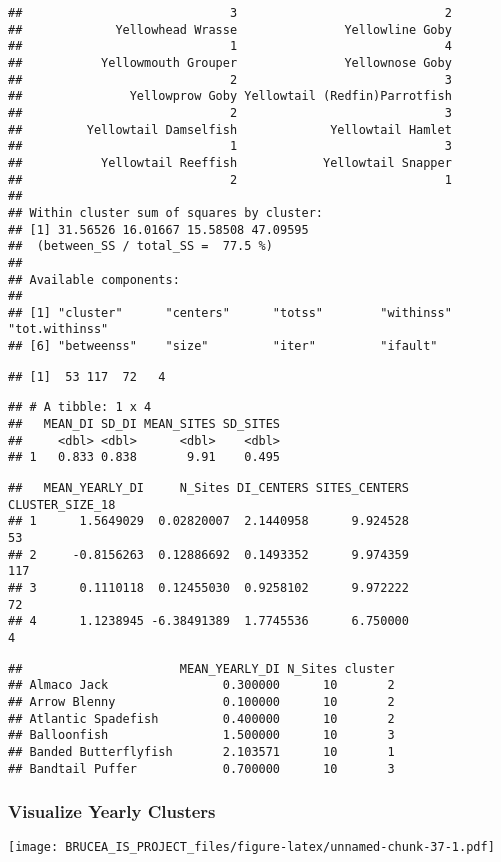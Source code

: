 \documentclass[
]{article}
\begin{document}
\begin{verbatim}
##                             3                             2 
##             Yellowhead Wrasse               Yellowline Goby 
##                             1                             4 
##           Yellowmouth Grouper               Yellownose Goby 
##                             2                             3 
##               Yellowprow Goby Yellowtail (Redfin)Parrotfish 
##                             2                             3 
##         Yellowtail Damselfish             Yellowtail Hamlet 
##                             1                             3 
##           Yellowtail Reeffish            Yellowtail Snapper 
##                             2                             1 
## 
## Within cluster sum of squares by cluster:
## [1] 31.56526 16.01667 15.58508 47.09595
##  (between_SS / total_SS =  77.5 %)
## 
## Available components:
## 
## [1] "cluster"      "centers"      "totss"        "withinss"     "tot.withinss"
## [6] "betweenss"    "size"         "iter"         "ifault"
\end{verbatim}

\begin{verbatim}
## [1]  53 117  72   4
\end{verbatim}

\begin{verbatim}
## # A tibble: 1 x 4
##   MEAN_DI SD_DI MEAN_SITES SD_SITES
##     <dbl> <dbl>      <dbl>    <dbl>
## 1   0.833 0.838       9.91    0.495
\end{verbatim}

\begin{verbatim}
##   MEAN_YEARLY_DI     N_Sites DI_CENTERS SITES_CENTERS CLUSTER_SIZE_18
## 1      1.5649029  0.02820007  2.1440958      9.924528              53
## 2     -0.8156263  0.12886692  0.1493352      9.974359             117
## 3      0.1110118  0.12455030  0.9258102      9.972222              72
## 4      1.1238945 -6.38491389  1.7745536      6.750000               4
\end{verbatim}

\begin{verbatim}
##                      MEAN_YEARLY_DI N_Sites cluster
## Almaco Jack                0.300000      10       2
## Arrow Blenny               0.100000      10       2
## Atlantic Spadefish         0.400000      10       2
## Balloonfish                1.500000      10       3
## Banded Butterflyfish       2.103571      10       1
## Bandtail Puffer            0.700000      10       3
\end{verbatim}

\hypertarget{visualize-yearly-clusters}{%
\subsubsection{Visualize Yearly
Clusters}\label{visualize-yearly-clusters}}

\texttt{[image: BRUCEA\_IS\_PROJECT\_files/figure-latex/unnamed-chunk-37-1.pdf]}
\end{document}
